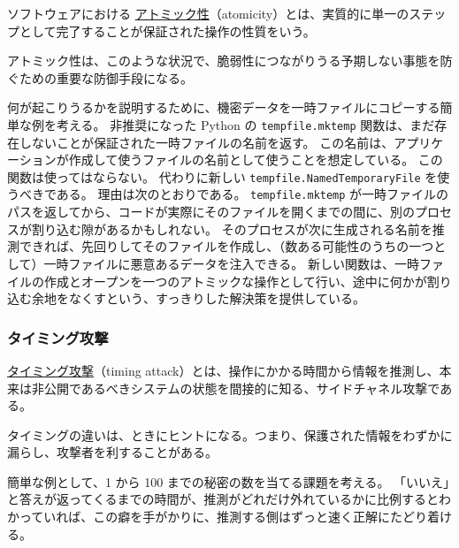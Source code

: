 \documentclass[uplatex]{jsarticle}
\def\label#1{}%
\begin{document}
\begin{dfn}[アトミック性]\label{dfn:ch8-atomicity}
ソフトウェアにおける \underline{アトミック性}（atomicity）とは、実質的に単一のステップとして完了することが保証された操作の性質をいう。
\end{dfn}

アトミック性は、このような状況で、脆弱性につながりうる予期しない事態を防ぐための重要な防御手段になる。

\begin{exa}[一時ファイルの作成と競合状態]\label{exa:ch8-tempfile}
何が起こりうるかを説明するために、機密データを一時ファイルにコピーする簡単な例を考える。
非推奨になった Python の \texttt{tempfile.mktemp} 関数は、まだ存在しないことが保証された一時ファイルの名前を返す。
この名前は、アプリケーションが作成して使うファイルの名前として使うことを想定している。
この関数は使ってはならない。
代わりに新しい \texttt{tempfile.NamedTemporaryFile} を使うべきである。
理由は次のとおりである。
\texttt{tempfile.mktemp} が一時ファイルのパスを返してから、コードが実際にそのファイルを開くまでの間に、別のプロセスが割り込む隙があるかもしれない。
そのプロセスが次に生成される名前を推測できれば、先回りしてそのファイルを作成し、（数ある可能性のうちの一つとして）一時ファイルに悪意あるデータを注入できる。
新しい関数は、一時ファイルの作成とオープンを一つのアトミックな操作として行い、途中に何かが割り込む余地をなくすという、すっきりした解決策を提供している。
\end{exa}

\subsubsection{タイミング攻撃}

\begin{dfn}[タイミング攻撃]\label{dfn:ch8-timing-attack}
\underline{タイミング攻撃}（timing attack）とは、操作にかかる時間から情報を推測し、本来は非公開であるべきシステムの状態を間接的に知る、サイドチャネル攻撃である。
\end{dfn}

タイミングの違いは、ときにヒントになる。つまり、保護された情報をわずかに漏らし、攻撃者を利することがある。

\begin{exa}[秘密の数の推測]\label{exa:ch8-guess-number}
簡単な例として、1 から 100 までの秘密の数を当てる課題を考える。
「いいえ」と答えが返ってくるまでの時間が、推測がどれだけ外れているかに比例するとわかっていれば、この癖を手がかりに、推測する側はずっと速く正解にたどり着ける。
\end{exa}
\end{document}

